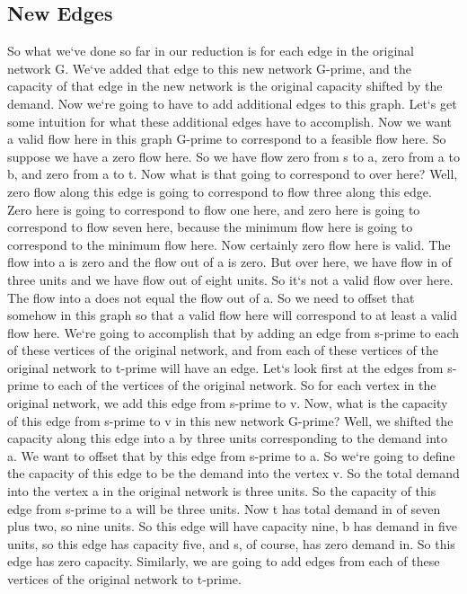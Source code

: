 \subsection{New Edges}
So what we`ve done so far in our reduction is for each edge in the original network G\@.
We`ve added that edge to this new network G-prime, and the capacity of that edge in the new network is the original capacity shifted by the demand.
Now we`re going to have to add additional edges to this graph.
Let`s get some intuition for what these additional edges have to accomplish.
Now we want a valid flow here in this graph G-prime to correspond to a feasible flow here.
So suppose we have a zero flow here.
So we have flow zero from s to a, zero from a to b, and zero from a to t.
Now what is that going to correspond to over here? Well, zero flow along this edge is going to correspond to flow three along this edge.
Zero here is going to correspond to flow one here, and zero here is going to correspond to flow seven here, because the minimum flow here is going to correspond to the minimum flow here.
Now certainly zero flow here is valid.
The flow into a is zero and the flow out of a is zero.
But over here, we have flow in of three units and we have flow out of eight units.
So it`s not a valid flow over here.
The flow into a does not equal the flow out of a.
So we need to offset that somehow in this graph so that a valid flow here will correspond to at least a valid flow here.
We`re going to accomplish that by adding an edge from s-prime to each of these vertices of the original network, and from each of these vertices of the original network to t-prime will have an edge.
Let`s look first at the edges from s-prime to each of the vertices of the original network.
So for each vertex in the original network, we add this edge from s-prime to v.
Now, what is the capacity of this edge from s-prime to v in this new network G-prime? Well, we shifted the capacity along this edge into a by three units corresponding to the demand into a.
We want to offset that by this edge from s-prime to a.
So we`re going to define the capacity of this edge to be the demand into the vertex v.
So the total demand into the vertex a in the original network is three units.
So the capacity of this edge from s-prime to a will be three units.
Now t has total demand in of seven plus two, so nine units.
So this edge will have capacity nine, b has demand in five units, so this edge has capacity five, and s, of course, has zero demand in.
So this edge has zero capacity.
Similarly, we are going to add edges from each of these vertices of the original network to t-prime.
